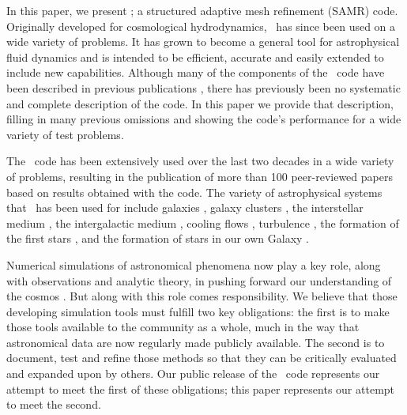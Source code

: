 In this paper, we present \enzo; a structured adaptive mesh refinement
(SAMR) code. Originally developed for cosmological hydrodynamics,
\enzo\ has since been used on a wide variety of problems.  It has
grown to become a general tool for astrophysical fluid dynamics and is
intended to be efficient, accurate and easily extended to include new
capabilities.  Although many of the components of the \enzo\ code have
been described in previous publications \citep{1995CoPhC..89..149B,
BryanThesis96, Bryan97a, Bryan97b, Norman99, BryanCompSci99, Bryan01,
Oshea04, 2007arXiv0705.1556N,
WangAbelZhang08,ReynoldsHayesPaschosNorman2009,Collins10,Wise11_Moray},
there has previously been no systematic and complete description of
the code.  In this paper we provide that description, filling in many
previous omissions and showing the code's performance for a wide
variety of test problems.

The \enzo\ code has been extensively used over the last two decades in
a wide variety of problems, resulting in the publication of more than
100 peer-reviewed papers based on results obtained with the code. The
variety of astrophysical systems that \enzo\ has been used for include
galaxies \citep{2003ApJ...587...13T, 2012MNRAS.425..641L,
  2012ApJ...749..140H, 2013MNRAS.432.1989S}, galaxy
clusters \citep{Loken02, Xu11, Skillman13}, the interstellar medium
\citep{Slyz05}, the intergalactic medium \citep{Fang01,
2011ApJ...731....6S}, cooling flows \citep{Li12, 2013ApJ...763...38S},
turbulence \citep{Kritsuk04, 2007ApJ...665..416K, 2009JPhCS.180a2020K, Collins11}, the
formation of the first stars \citep{ABN02, 2007ApJ...654...66O,
2009Sci...325..601T, Xu08}, and the formation of stars in our own Galaxy
\citep{Collins11, 2011ApJ...727L..20K, Collins12a}.

Numerical simulations of astronomical phenomena now play a key role,
along with observations and analytic theory, in pushing forward our
understanding of the cosmos \citep[e.g.,][]{DecadalSurvey01,
DecadalSurvey10}.  But along with this role comes responsibility.  We
believe that those developing simulation tools must fulfill two key
obligations: the first is to make those tools available to the
community as a whole, much in the way that astronomical data are now
regularly made publicly available.  The second is to document, test
and refine those methods so that they can be critically evaluated and
expanded upon by others.  Our public release of the \enzo\ code represents our
attempt to meet the first of these obligations; this paper represents
our attempt to meet the second.

